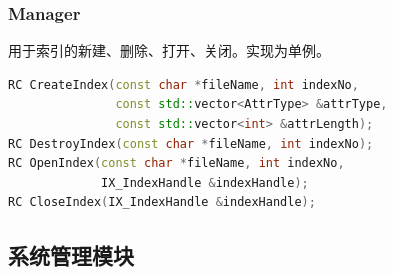 \documentclass{article}
\begin{document}
\subsubsection{Manager}
用于索引的新建、删除、打开、关闭。实现为单例。
\begin{lstlisting}[language=C++]
RC CreateIndex(const char *fileName, int indexNo,
			   const std::vector<AttrType> &attrType,
			   const std::vector<int> &attrLength);
RC DestroyIndex(const char *fileName, int indexNo);
RC OpenIndex(const char *fileName, int indexNo,
             IX_IndexHandle &indexHandle);
RC CloseIndex(IX_IndexHandle &indexHandle);
\end{lstlisting}

\subsection{系统管理模块}
\end{document}
